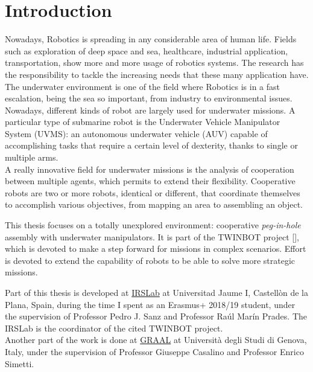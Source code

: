 

\chapter{Introduction}
\label{chap:introduction}
\ifpdf
    \graphicspath{{Introduction/Figures/PNG/}{Introduction/Figures/PDF/}{Introduction/Figures/}}
\else
    \graphicspath{{Introduction/Figures/EPS/}{Introduction/Figures/}}
\fi

Nowadays, Robotics is spreading in any considerable area of human life. Fields such as exploration of deep space and sea, healthcare, industrial application, transportation, show more and more usage of robotics systems. The research has the responsibility to tackle the increasing needs that these many application have.\\
The underwater environment is one of the field where Robotics is in a fast escalation, being the sea so important, from industry to environmental issues. Nowadays, different kinds of robot are largely used for underwater missions. A particular type of submarine robot is the Underwater Vehicle Manipulator System (UVMS): an autonomous underwater vehicle (AUV) capable of accomplishing tasks that require a certain level of dexterity, thanks to single or multiple arms.\\
A really innovative field for underwater missions is the analysis of cooperation between multiple agents, which permits to extend their flexibility. Cooperative robots are two or more robots, identical or different, that coordinate themselves to accomplish various objectives, from mapping an area to assembling an object.   

This thesis focuses on a totally unexplored environment: cooperative \textit{peg-in-hole} assembly with underwater manipulators. It is part of the TWINBOT project \mbox{[\cite{TWINBOT2019}]}, which is devoted to make a step forward for missions in complex scenarios. Effort is devoted to extend the capability of robots to be able to solve more strategic missions.

Part of this thesis is developed at \href{http://www.irs.uji.es/}{IRSLab} at Universitad Jaume I, Castell\`{o}n de la Plana, Spain, during the time I spent as an Erasmus+ 2018/19 student, under the supervision of Professor Pedro J. Sanz and Professor Ra\'{u}l Mar\'{i}n Prades. The IRSLab is the coordinator of the cited TWINBOT project. \\
Another part of the work is done at \href{http://www.graal.dibris.unige.it/}{GRAAL} at Universit\`{a} degli Studi di Genova, Italy, under the supervision of Professor Giuseppe Casalino and Professor Enrico Simetti.\\

